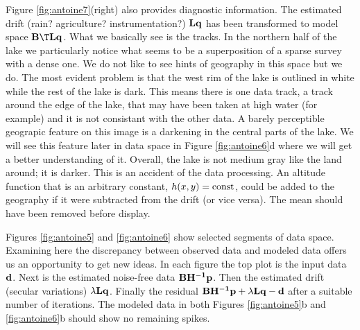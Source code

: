 \par
Figure \ref{fig:antoine7}(right) also provides diagnostic information.
The estimated drift (rain? agriculture? instrumentation?)
$\bold L\bold q$ has been transformed
to model space $\bold B\T\bold L\bold q$.
What we basically see is the tracks.
In the northern half of the lake we particularly notice
what seems to be a superposition of a sparse survey with a dense one.
We do not like to see hints of geography in this space but we do.
The most evident problem is that the west rim of the lake
is outlined in white while the rest of the lake is dark.
This means there is one data track, a track around the edge of the lake,
that may have been taken at high water (for example) and
it is not consistant with the other data.
A barely perceptible geograpic feature on this image
is a darkening in the central parts of the lake.
We will see this feature later in data space in Figure \ref{fig:antoine6}d
where we will get a better understanding of it.
Overall, the lake is not medium gray like the land around; it is darker.
This is an accident of the data processing.
An altitude function that is an arbitrary constant,
$h(x,y)= {\rm const}$, could be added to the geography if
it were subtracted from the drift (or vice versa).
The mean should have been removed before display.


\par
Figures \ref{fig:antoine5} and \ref{fig:antoine6} show
selected segments of data space.
Examining here the discrepancy between observed data and modeled data
offers us an opportunity to get new ideas.
In each figure the top plot is the input data $\bold{d}$.
Next is the estimated noise-free data ${\bf BH^{-1}p}$.
Then the estimated drift (secular variations) $\lambda \bold L \bold q$.
Finally the residual
$\bold B \bold {H^{-1}} \bold p + \lambda \bold L \bold q - \bold d$
after a suitable number of iterations.
The modeled data in both Figures \ref{fig:antoine5}b and 
\ref{fig:antoine6}b should show no remaining spikes.


